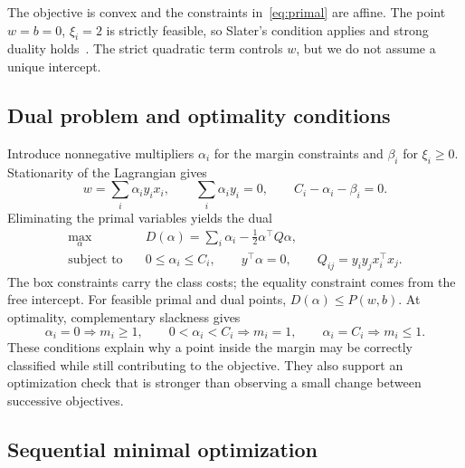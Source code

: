 \documentclass{article}
\begin{document}
The objective is convex and the constraints in~\eqref{eq:primal} are affine. The point $w=b=0$, $\xi_i=2$ is strictly feasible, so Slater's condition applies and strong duality holds~\citep{boyd2004}. The strict quadratic term controls $w$, but we do not assume a unique intercept.

\subsection{Dual problem and optimality conditions}

Introduce nonnegative multipliers $\alpha_i$ for the margin constraints and $\beta_i$ for $\xi_i\geq0$. Stationarity of the Lagrangian gives
\begin{equation}
 w=\sum_i\alpha_i y_ix_i,\qquad \sum_i\alpha_i y_i=0,
 \qquad C_i-\alpha_i-\beta_i=0.
\end{equation}
Eliminating the primal variables yields the dual
\begin{equation}
 \begin{aligned}
 \max_{\alpha}\quad&D(\alpha)=\sum_i\alpha_i-\frac12\alpha^\top Q\alpha,\\
 \text{subject to}\quad&0\leq\alpha_i\leq C_i,\qquad y^\top\alpha=0,
 \qquad Q_{ij}=y_i y_j x_i^\top x_j.
 \end{aligned}
 \label{eq:dual}
\end{equation}
The box constraints carry the class costs; the equality constraint comes from the free intercept. For feasible primal and dual points, $D(\alpha)\leq P(w,b)$. At optimality, complementary slackness gives
\begin{equation}
 \alpha_i=0\Rightarrow m_i\geq1,\qquad
 0<\alpha_i<C_i\Rightarrow m_i=1,\qquad
 \alpha_i=C_i\Rightarrow m_i\leq1.
 \label{eq:kkt}
\end{equation}
These conditions explain why a point inside the margin may be correctly classified while still contributing to the objective. They also support an optimization check that is stronger than observing a small change between successive objectives.

\subsection{Sequential minimal optimization}
\end{document}
